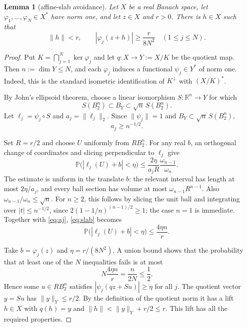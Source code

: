 \documentclass[11pt]{article}
\newtheorem{lemma}[theorem]{Lemma}
\newcommand{\R}{\mathbb R}
\begin{document}
\begin{lemma}[affine-slab avoidance]\label{lem:finite}
Let $X$ be a real Banach space, let
$\varphi_1,\dots,\varphi_N\in X^*$ have norm one, and let $z\in X$ and
$r>0$.  There is $h\in X$ such that
\[
 \|h\|<r,
 \qquad
 |\varphi_j(z+h)|\geq \frac{r}{8N^2}
 \quad(1\leq j\leq N).
\]
\end{lemma}

\begin{proof}
Put $K=\bigcap_{j=1}^N\ker\varphi_j$ and let $q:X\to Y:=X/K$ be the
quotient map.  Then $n:=\dim Y\leq N$, and each $\varphi_j$ induces a
functional $\psi_j\in Y^*$ of norm one.  Indeed, this is the standard
isometric identification of $K^\perp$ with $(X/K)^*$.

By John's ellipsoid theorem, choose a linear isomorphism
$S:\R^n\to Y$ for which
\[
 S(B_2^n)\subset B_Y\subset \sqrt n\,S(B_2^n).
\]
Let $\ell_j=\psi_j\circ S$ and $a_j=\|\ell_j\|_2$.  Since
$\|\psi_j\|=1$ and $B_Y\subset\sqrt n\,S(B_2^n)$,
\begin{equation}\label{eq:aj}
 a_j\geq n^{-1/2}.
\end{equation}

Set $R=r/2$ and choose $U$ uniformly from $RB_2^n$.  For any real $b$,
an orthogonal change of coordinates and slicing perpendicular to $\ell_j$
give
\begin{equation}\label{eq:slab}
 \mathbb P\bigl(|\ell_j(U)+b|<\eta\bigr)
 \leq \frac{2\eta}{a_jR}\frac{\omega_{n-1}}{\omega_n}.
\end{equation}
The estimate is uniform in the translate $b$: the relevant interval has
length at most $2\eta/a_j$, and every ball section has volume at most
$\omega_{n-1}R^{n-1}$.  Also
$\omega_{n-1}/\omega_n\leq\sqrt n$.  For $n\geq2$, this follows by slicing
the unit ball and integrating over $|t|\leq n^{-1/2}$, since
$2(1-1/n)^{(n-1)/2}\geq1$; the case $n=1$ is immediate.
Together with \eqref{eq:aj}, \eqref{eq:slab} becomes
\[
 \mathbb P\bigl(|\ell_j(U)+b|<\eta\bigr)
 \leq \frac{4\eta n}{r}.
\]

Take $b=\varphi_j(z)$ and $\eta=r/(8N^2)$.  A union bound shows that the
probability that at least one of the $N$ inequalities fails is at most
\[
 N\frac{4\eta n}{r}=\frac{n}{2N}\leq\frac12.
\]
Hence some $u\in RB_2^n$ satisfies
$|\psi_j(qz+Su)|\geq\eta$ for all $j$.  The quotient vector $y=Su$ has
$\|y\|_Y\leq r/2$.  By the definition of the quotient norm it has a lift
$h\in X$ with $q(h)=y$ and
$\|h\|<\|y\|_Y+r/2\leq r$.  This lift has all the required properties.
\end{proof}
\end{document}
